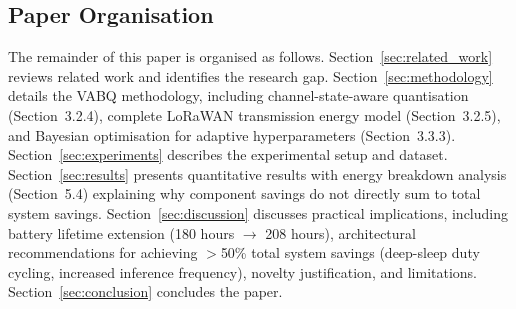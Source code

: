 \subsection{Paper Organisation}
\label{sec:intro_organisation}

The remainder of this paper is organised as follows. Section~\ref{sec:related_work} reviews related work and identifies the research gap. Section~\ref{sec:methodology} details the VABQ methodology, including channel-state-aware quantisation (Section~3.2.4), complete LoRaWAN transmission energy model (Section~3.2.5), and Bayesian optimisation for adaptive hyperparameters (Section~3.3.3). Section~\ref{sec:experiments} describes the experimental setup and dataset. Section~\ref{sec:results} presents quantitative results with energy breakdown analysis (Section~5.4) explaining why component savings do not directly sum to total system savings. Section~\ref{sec:discussion} discusses practical implications, including battery lifetime extension (180 hours $\rightarrow$ 208 hours), architectural recommendations for achieving $>$50\% total system savings (deep-sleep duty cycling, increased inference frequency), novelty justification, and limitations. Section~\ref{sec:conclusion} concludes the paper.
